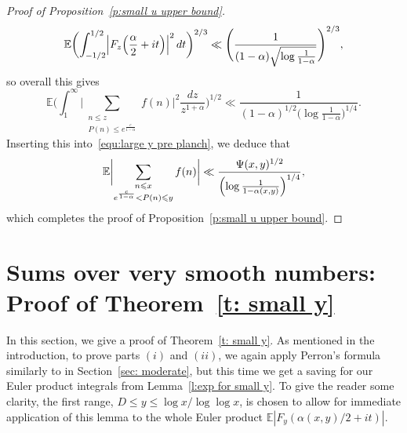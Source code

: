 \documentclass[12pt,a4paper,reqno]{amsart}
\numberwithin{equation}{section}
\def\E{\mathbb E}
\def\leq {\leqslant}
\theoremstyle{remark}
\theoremstyle{definition}
\numberwithin{equation}{section}
\theoremstyle{remark}
\def\E{\mathbb E}
\begin{document}
\begin{proof}[Proof of Proposition~\ref{p:small u upper bound}]
\[
\E \biggl( \int_{-1/2}^{1/2} \Bigl| F_{z} \Bigl( \frac{\alpha}{2} + it \Bigr) \Bigr|^2 \, dt \biggr)^{2/3} \ll \Biggl( \frac{1}{(1 - \alpha) \sqrt{\log \frac{1}{1-\alpha}}} \Biggr)^{2/3},
\]
so overall this gives
\[
\E \biggl( \int_{1}^{\infty} \biggl| \sum_{\substack{n \leq z \\ P(n) \leq e^{\frac{c}{1 - \alpha}}}} f(n) \biggr|^2 \frac{dz}{z^{1 + \alpha}} \biggr)^{1/2} \ll \frac{1}{(1 - \alpha)^{1/2} \bigl( \log \frac{1}{1 - \alpha} \bigr)^{1/4}} .
\]
Inserting this into~\eqref{equ:large y pre planch}, we deduce that
\[
\E \biggl| \sum_{\substack{n \leq x \\ e^{\frac{c}{1-\alpha}} < P(n) \leq y}} f(n) \biggr| \ll \frac{\Psi (x,y)^{1/2}}{\Bigl(\log \frac{1}{1-\alpha(x,y)} \Bigr)^{1/4}},
\]
which completes the proof of Proposition~\ref{p:small u upper bound}.
\end{proof}

\section{Sums over very smooth numbers: Proof of Theorem~\ref{t: small y}}\label{Sec: small y}
In this section, we give a proof of Theorem~\ref{t: small y}. As mentioned in the introduction, to prove parts $(i)$ and $(ii)$, we again apply Perron's formula similarly to in Section~\ref{sec: moderate}, but this time we get a saving for our Euler product integrals from Lemma~\ref{l:exp for small y}. To give the reader some clarity, the first range, $D \leq y \leq \log x / \log \log x$, is chosen to allow for immediate application of this lemma to the whole Euler product $\E |F_y (\alpha(x,y) / 2 + it)|$.
\end{document}

